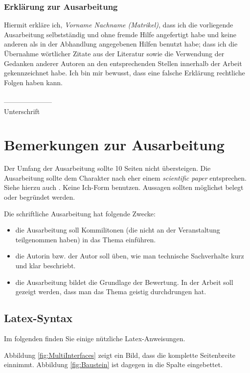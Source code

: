 \documentclass[fleqn,10pt,ngerman]{SelfArx}
\begin{document}
\subsubsection*{Erklärung zur Ausarbeitung}
Hiermit erkläre ich, {\it Vorname Nachname (Matrikel)}, dass ich die vorliegende Ausarbeitung selbstständig und ohne fremde Hilfe angefertigt habe und keine anderen als in der Abhandlung angegebenen Hilfen benutzt habe; dass ich die Übernahme wörtlicher Zitate aus der Literatur sowie die Verwendung der Gedanken anderer Autoren an den entsprechenden Stellen innerhalb der Arbeit gekennzeichnet habe. Ich bin mir bewusst, dass eine falsche Erklärung rechtliche Folgen haben kann.\\ \\
--------------------- \\
Unterschrift


\clearpage
\newpage
\appendix
\section{Bemerkungen zur Ausarbeitung}
Der Umfang der Ausarbeitung sollte 10 Seiten nicht übersteigen. Die Ausarbeitung sollte dem Charakter nach eher einem {\it scientific paper} entsprechen. Siehe hierzu auch  \cite{Rechenberg}. Keine Ich-Form benutzen. Aussagen sollten möglichst belegt oder begründet werden.

Die schriftliche Ausarbeitung hat folgende Zwecke:
\begin{itemize}[noitemsep]
\item die Ausarbeitung soll Kommilitonen (die nicht an der Veranstaltung teilgenommen haben) in das Thema ein\-führen.
\item die Autorin bzw. der Autor soll üben, wie man technische Sachverhalte kurz und klar beschriebt.
\item die Ausarbeitung bildet die Grundlage der Bewertung. In der Arbeit soll
gezeigt werden, dass man das Thema geistig durchdrungen hat.
\end{itemize}


\subsection{Latex-Syntax}
Im folgenden finden Sie einige nützliche Latex-Anweisungen.

Abbildung \ref{fig:MultiInterfaces} zeigt ein Bild, dass die komplette Seitenbreite einnimmt. Abbildung \ref{fig:Baustein} ist dagegen in die Spalte eingebettet.
\end{document}
